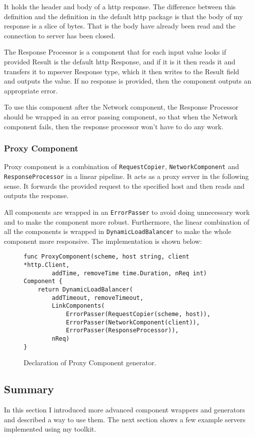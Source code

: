 \documentclass[12pt,a4paper]{article}
\begin{document}
It holds the header and body of a http response. The difference between
this definition and the definition in the default http package is that
the body of my response is a slice of bytes. That is the body have already been
read and the connection to server has been closed.

The Response Processor is a component that for each input value
looks if provided Result is the default http Response, and if it is
it then reads it and transfers it to mpsever Response type, which it
then writes to the Result field and outputs the value. If no response
is provided, then the component outputs an appropriate error.

To use this component after the Network component, the Response Processor
should be wrapped in an error passing component, so that when the 
Network component fails, then the response processor won't have to do
any work.

\subsubsection{Proxy Component}
Proxy component is a combination of \texttt{RequestCopier}, 
\texttt{NetworkComponent} 
and \texttt{ResponseProcessor} in a linear pipeline. It acts as a proxy server
in the following sense. It forwards the provided request to the specified
host and then reads and outputs the response. 

All components are wrapped
in an \texttt{ErrorPasser} to avoid doing unnecessary work and to make the component
more robust. Furthermore, the linear combination of all the components is wrapped in 
\texttt{DynamicLoadBalancer} to make the whole component more 
responsive. The implementation is shown below:

\begin{figure}[h]
\centering
\begin{lstlisting}
func ProxyComponent(scheme, host string, client *http.Client, 
        addTime, removeTime time.Duration, nReq int) Component {
    return DynamicLoadBalancer(
        addTimeout, removeTimeout,
        LinkComponents(
            ErrorPasser(RequestCopier(scheme, host)),
            ErrorPasser(NetworkComponent(client)),
            ErrorPasser(ResponseProcessor)),
        nReq)
}
\end{lstlisting}
\caption[scale=1.0]{Declaration of Proxy Component generator.}
\label{fig:ProxyComp}
\end{figure}
\newpage
\subsection{Summary}
In this section I introduced more advanced component wrappers and generators
and described a way to use them. The next section shows a few example
servers implemented using my toolkit.
\end{document}
